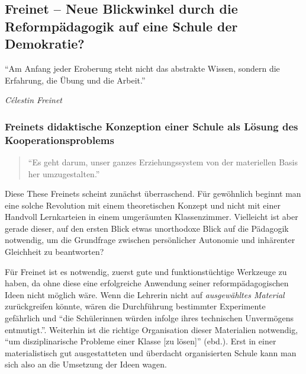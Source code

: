 \subsection[Freinet]{Freinet -- Neue Blickwinkel durch die Reformpädagogik auf eine Schule der Demokratie?}

	\epigraph{
		``Am Anfang jeder Eroberung steht nicht das abstrakte Wissen, sondern die Erfahrung, die Übung und die Arbeit.''}
	{
		\emph{Célestin Freinet}
	}

\subsubsection{Freinets didaktische Konzeption einer Schule als Lösung des Kooperationsproblems}

	\begin{quote} ``Es geht darum, unser ganzes Erziehungssystem von der materiellen Basis her umzugestalten.''
		\cite[S.~99]{Freinet1979}
	\end{quote}

Diese These Freinets scheint zunächst überraschend.
Für gewöhnlich beginnt man eine solche Revolution mit einem theoretischen Konzept und nicht mit einer Handvoll Lernkarteien in einem umgeräumten Klassenzimmer.
Vielleicht ist aber gerade dieser, auf den ersten Blick etwas unorthodoxe Blick auf die Pädagogik notwendig, um die Grundfrage zwischen persönlicher Autonomie und inhärenter Gleichheit zu beantworten?

Für Freinet ist es notwendig, zuerst gute und funktionstüchtige Werkzeuge zu haben, da ohne diese eine erfolgreiche Anwendung seiner reformpädagogischen Ideen nicht möglich wäre.
Wenn die Lehrerin nicht auf \emph{ausgewähltes Material} zurückgreifen könnte, wären die Durchführung bestimmter Experimente gefährlich und ``die Schülerinnen würden infolge ihres technischen Unvermögens entmutigt.''\parencite[S.~98]{Freinet1979}.
Weiterhin ist die richtige Organisation dieser Materialien notwendig, ``um disziplinarische Probleme einer Klasse [zu lösen]'' (ebd.).
Erst in einer materialistisch gut ausgestatteten und überdacht organisierten Schule kann man sich also an die Umsetzung der Ideen wagen.

